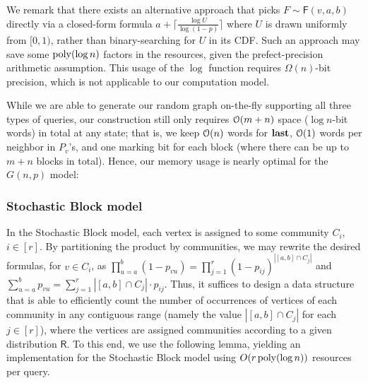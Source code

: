 \ERGrand*

We remark that there exists an alternative approach that picks $F\sim\mathsf{F}(v,a,b)$ directly via a closed-form formula $a+\lceil\frac{\log U}{\log (1-p)}\rceil$ where $U$ is drawn uniformly from $[0,1)$, rather than binary-searching for $U$ in its CDF. Such an approach may save some $\mathrm{poly}(\log n)$ factors in the resources, given the prefect-precision arithmetic assumption. This usage of the $\log$ function requires $\Omega(n)$-bit precision, which is not applicable to our computation model.

While we are able to generate our random graph on-the-fly supporting all three types of queries, our construction still only requires $\mathcal{O}(m+n)$ space ($\log n$-bit words) in total at any state; that is, we keep $\mathcal{O}(n)$ words for $\mathbf{last}$, $\mathcal{O}(1)$ words per neighbor in $P_v$'s, and one marking bit for each block (where there can be up to $m+n$ blocks in total). Hence, our memory usage is nearly optimal for the $G(n,p)$ model:

\EROptimal*

\iffalse
The deterministic version (Section~\ref{sec:ER-det}) does not require the extra overhead resulting from failed iterations.
However, the two level data-structure introduces an extra $\Bo(\log n)$ factor, resulting in the same overall running time.
However, this only requires one $N$-bit random word.
\fi





\subsubsection{Stochastic Block model}
\label{sec:application_sbm}
In the Stochastic Block model, each vertex is assigned to some community $C_i$, $i \in [r]$.
By partitioning the product by communities, we may rewrite the desired formulas, for $v \in C_i$,
as $\prod_{u=a}^b (1-p_{vu}) = \prod_{j=1}^r (1-p_{ij})^{|[a,b]\cap C_j|}$ and $\sum_{u=a}^b p_{vu}=\sum_{j=1}^r |[a,b]\cap C_j|\cdot p_{ij}$.
Thus, it suffices to design a data structure that is able to efficiently count the number of occurrences of vertices of each community
in any contiguous range (namely the value $|[a,b]\cap C_j|$ for each $j \in [r]$),
where the vertices are assigned communities according to a given distribution $\mathsf{R}$.
To this end, we use the following lemma,
yielding an implementation for the Stochastic Block model using $O(r\, \mathrm{poly}(\log n))$ resources per query.

